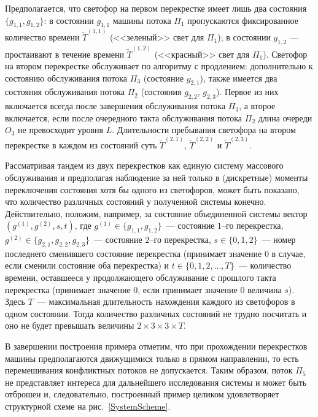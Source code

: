 Предполагается,  что светофор на первом перекрестке имеет лишь два состояния $\{g_{1, 1}, g_{1, 2}\}$: в состоянии $g_{1, 1}$ машины потока $\Pi_1$ пропускаются фиксированное количество времени $\widetilde T^{(1, 1)}$ (<<зеленый>> свет для $\Pi_1$); в состоянии $g_{1, 2}$ --- простаивают в течение времени $\widetilde T^{(1, 2)}$ (<<красный>> свет для $\Pi_1$). Светофор на втором перекрестке обслуживает по алгоритму с продлением: дополнительно к состоянию обслуживания потока $\Pi_3$ (состояние $g_{2, 1}$),  также имеется два состояния обслуживания потока $\Pi_2$ (состояния $g_{2, 2}$,  $g_{2, 3}$). Первое из них включается всегда после завершения обслуживания потока $\Pi_3$,  а второе включается,  если после очередного такта обслуживания потока $\Pi_2$ длина очереди $O_3$ не превосходит уровня $L$.
Длительности пребывания светофора на втором перекрестке в каждом из состояний суть $\widetilde T^{(2, 1)}$,  $\widetilde T^{(2, 2)}$ и $\widetilde T^{(2, 3)}$.


Рассматривая тандем из двух перекрестков как единую систему массового обслуживания и предполагая наблюдение за ней только в (дискретные) моменты переключения состояния хотя бы одного из светофоров,  может быть показано,  что количество различных состояний у полученной системы конечно. Действительно,  положим,  например,  за состояние объединенной системы вектор $(g^{(1)},  g^{(2)},  s,  t)$,  где $g^{(1)}\in \{g_{1,  1},  g_{1,  2}\}$~--- состояние $1$--го перекрестка,  $g^{(2)}\in \{g_{2,  1},  g_{2,  2},  g_{2,  3}\}$~--- состояние $2$--го перекрестка,  $s \in \{0,  1,  2\}$~--- номер последнего сменившего состояние перекрестка (принимает значение $0$ в случае,  если сменили состояние оба перекрестка) и $t \in \{0,  1,  2,  \ldots,  T\}$~--- количество времени,  оставшееся у продолжающего обслуживание с прошлого такта перекрестка (принимает значение $0$,  если принимает значение $0$ величина $s$). Здесь $T$~--- максимальная длительность нахождения каждого из светофоров в одном состоянии. Тогда количество различных состояний не трудно посчитать и оно не будет превышать величины  $2\times 3 \times 3 \times T$.

В завершении построения примера отметим,  что при прохождении перекрестков машины предполагаются движущимися только в прямом направлении,  то есть перемешивания конфликтных потоков не допускается. Таким образом,  поток $\Pi_5$ не представляет интереса для дальнейшего исследования системы и может быть отброшен и,  следовательно,  построенный пример целиком удовлетворяет структурной схеме на рис.~\ref{SystemScheme}.

